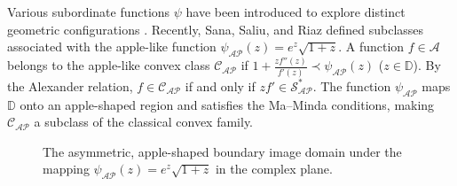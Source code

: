 \documentclass[10pt,a4paper]{amsart}
\numberwithin{equation}{section}
\begin{document}
Various subordinate functions $\psi$ have been introduced to explore distinct geometric configurations \cite{MM, Ravichandran2015, RavichandranVerma2017}. Recently, Sana, Saliu, and Riaz \cite{SanaSaliuRiaz} defined subclasses associated with the apple-like function $\psi_{\mathcal{AP}}(z)=e^{z}\sqrt{1+z}$. A function $f\in\mathcal{A}$ belongs to the apple-like convex class $\mathcal{C}_{\mathcal{AP}}$ if $1+\frac{zf''(z)}{f'(z)}\prec \psi_{\mathcal{AP}}(z)$ ($z\in\mathbb{D}$). By the Alexander relation, $f\in\mathcal{C}_{\mathcal{AP}}$ if and only if $zf'\in\mathcal{S}_{\mathcal{AP}}^{\ast}$. The function $\psi_{\mathcal{AP}}$ maps $\mathbb{D}$ onto an apple-shaped region and satisfies the Ma--Minda conditions, making $\mathcal{C}_{\mathcal{AP}}$ a subclass of the classical convex family.
\begin{figure}[htbp]
\centering
{}
\caption{The asymmetric, apple-shaped boundary image domain under the mapping $\psi_{\mathcal{AP}}(z) = e^z\sqrt{1+z}$ in the complex plane.}
\label{fig:apple_domain_region}
\end{figure}
\end{document}
